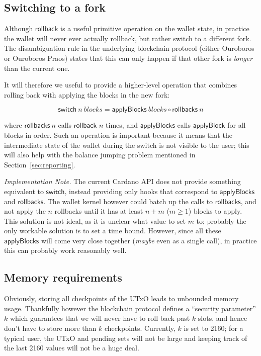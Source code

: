 \documentclass{article}
\begin{document}
\subsection{Switching to a fork}

Although $\mathsf{rollback}$ is a useful primitive operation on the wallet
state, in practice the wallet will never ever actually rollback, but rather
switch to a different fork. The disambiguation rule in the underlying blockchain
protocol (either Ouroboros or Ouroboros Praos) states that this can only happen
if that other fork is \emph{longer} than the current one.

It will therefore we useful to provide a higher-level operation that combines
rolling back with applying the blocks in the new fork:

\begin{equation}
\mathsf{switch} ~ n ~ \mathit{blocks} = \mathsf{applyBlocks} ~ \mathit{blocks} \circ \mathsf{rollbacks} ~ n
\end{equation}

where $\mathsf{rollbacks} ~ n$ calls $\mathsf{rollback}$ $n$ times, and
$\mathsf{applyBlocks}$ calls $\mathsf{applyBlock}$ for all blocks in order.
Such an operation is important because it means that the intermediate state
of the wallet during the switch is not visible to the user; this will also
help with the balance jumping problem mentioned in Section~\ref{sec:reporting}.

\emph{Implementation Note.} The current Cardano API does not provide something
equivalent to $\mathsf{switch}$, instead providing only hooks that correspond to
$\mathsf{applyBlocks}$ and $\mathsf{rollbacks}$. The wallet kernel however could
batch up the calls to $\mathsf{rollbacks}$, and not apply the $n$ rollbacks
until it has at least $n + m$ ($m \ge 1$) blocks to apply. This solution is not
ideal, as it is unclear what value to set $m$ to; probably the only workable
solution is to set a time bound. However, since all these $\mathsf{applyBlocks}$
will come very close together (\emph{maybe} even as a single call), in practice
this can probably work reasonably well.

\subsection{Memory requirements}

Obviously, storing all checkpoints of the UTxO leads to unbounded memory usage.
Thankfully however the blockchain protocol defines a ``security parameter'' $k$
which guarantees that we will never have to roll back past $k$ slots, and hence
don't have to store more than $k$ checkpoints. Currently, $k$ is set to 2160;
for a typical user, the UTxO and pending sets will not be large and keeping
track of the last 2160 values will not be a huge deal.
\end{document}
